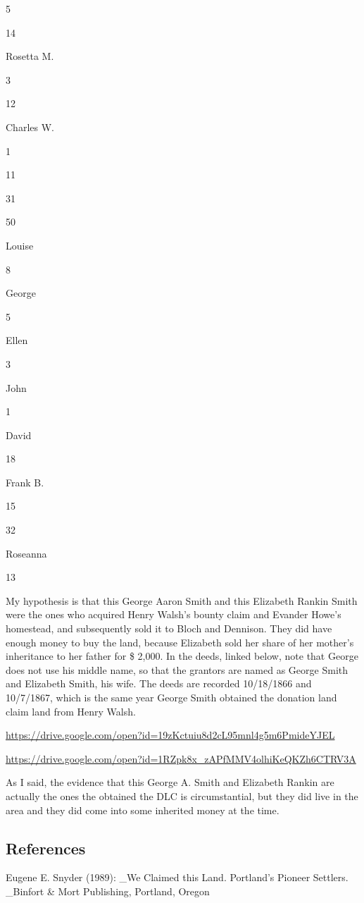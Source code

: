 \documentclass[
  12pt,
]{book}
\begin{document}
5

14

Rosetta M.

3

12

Charles W.

1

11

31

50

Louise

8

George

5

Ellen

3

John

1

David

18

Frank B.

15

32

Roseanna

13

My hypothesis is that this George Aaron Smith and this Elizabeth Rankin Smith were the ones who acquired Henry Walsh's bounty claim and Evander Howe's homestead, and subsequently sold it to Bloch and Dennison. They did have enough money to buy the land, because Elizabeth sold her share of her mother's inheritance to her father for \$ 2,000. In the deeds, linked below, note that George does not use his middle name, so that the grantors are named as George Smith and Elizabeth Smith, his wife. The deeds are recorded 10/18/1866 and 10/7/1867, which is the same year George Smith obtained the donation land claim land from Henry Walsh.

\url{https://drive.google.com/open?id=19zKctuiu8d2cL95mnl4g5m6PmideYJEL}

\url{https://drive.google.com/open?id=1RZpk8x_zAPfMMV4olhiKeQKZh6CTRV3A}

As I said, the evidence that this George A. Smith and Elizabeth Rankin are actually the ones the obtained the DLC is circumstantial, but they did live in the area and they did come into some inherited money at the time.

\hypertarget{references-5}{%
\subsection{References}\label{references-5}}

Eugene E. Snyder (1989): \_We Claimed this Land. Portland's Pioneer Settlers. \_Binfort \& Mort Publishing, Portland, Oregon
\end{document}
